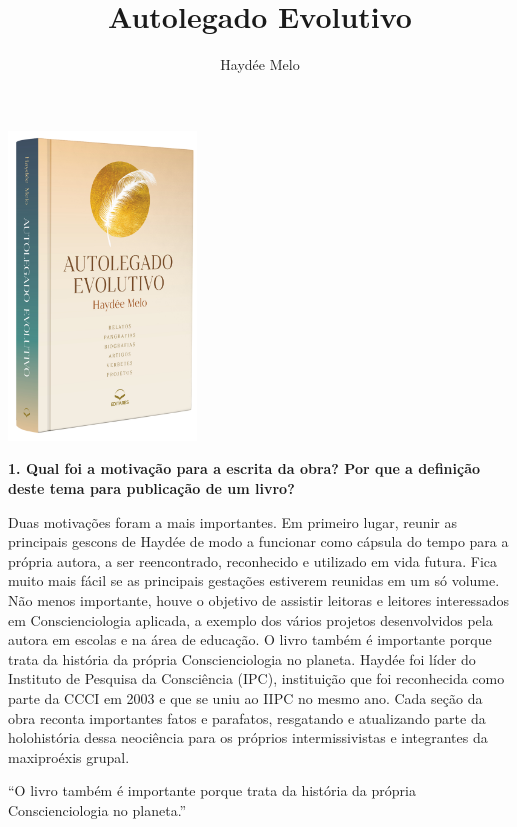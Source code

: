 \documentclass{gescons}
\author{Haydée Melo}
\title{Autolegado Evolutivo}
\begin{document}
    \makeentrevistatitle

    \begin{multicols}{3}

\begin{center}
    \includegraphics[width=5cm]{articles/entrevista/mockups/Haydee_Melo.png}
\end{center}


\textbf{1. Qual foi a motivação para a escrita da obra? Por que a definição deste tema para publicação de um livro?}


Duas motivações foram a mais importantes. Em primeiro lugar, reunir as principais gescons de Haydée de modo a funcionar como cápsula do tempo para a própria autora, a ser reencontrado, reconhecido e utilizado em vida futura. Fica muito mais fácil se as principais gestações estiverem reunidas em um só volume. Não menos importante, houve o objetivo de assistir leitoras e leitores interessados em Conscienciologia aplicada, a exemplo dos vários projetos desenvolvidos pela autora em escolas e na área de educação. O livro também é importante porque trata da história da própria Conscienciologia no planeta. Haydée foi líder do Instituto de Pesquisa da Consciência (IPC), instituição que foi reconhecida como parte da CCCI em 2003 e que se uniu ao IIPC no mesmo ano. Cada seção da obra reconta importantes fatos e parafatos, resgatando e atualizando parte da holohistória dessa neociência para os próprios intermissivistas e integrantes da maxiproéxis grupal.

\begin{pullquote}
``O livro também é importante porque trata da história da própria Conscienciologia no planeta.''
\end{pullquote}


\end{multicols}
\end{document}
